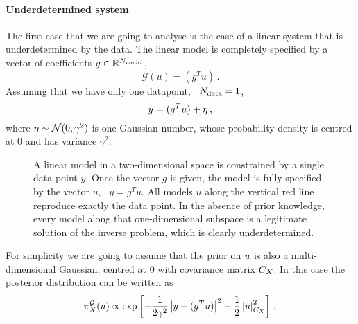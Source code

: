 \paragraph{Underdetermined system}
The first case that we are going to analyse is the case of a linear system that
is underdetermined by the data. The linear model is completely specified by a
vector of coefficients $g\in \mathbb{R}^{N_{\rm model}}$, 
\begin{equation}
  \label{eq:LinSyst}
  \mathcal{G}(u) = \left(g^T u\right)\, .
\end{equation}
Assuming that we have only one datapoint, \ie\ $N_{\rm data}=1$, 
\begin{equation}
  \label{eq:LinearModelEx}
  y = (g^T u) + \eta\, ,
\end{equation}
where $\eta \sim \mathcal{N}(0,\gamma^2)$ is one Gaussian number, whose
probability density is centred at $0$ and has variance $\gamma^2$. 
%
\begin{figure}[h!]
  \centering
  \caption{A linear model in a two-dimensional space is constrained by a single data point $y$. Once the vector $g$ is given, the model is fully specified by the vector $u$, \viz\ $y=g^T u$. All models $u$ along the vertical red line reproduce exactly the data point. In the absence of prior knowledge, every model along that one-dimensional subspace is a legitimate solution of the inverse problem, which is clearly underdetermined.}
  \label{fig:2dexample}
\end{figure}
%
For simplicity we are going to assume that the prior on $u$ is also a
multi-dimensional Gaussian, centred at $0$ with covariance matrix
$C_X$. In this case the posterior distribution can be written as
\begin{equation}
  \label{eq:GaussPostExplicit}
    \pi_{X}^{\mathcal{G}}(u) 
    \propto \exp \left[
      -\frac{1}{2\gamma^2} \left|y - (g^T u) \right|^2 - \frac12 \left|u\right|_{C_X}^2 
    \right]\, ,
\end{equation}
